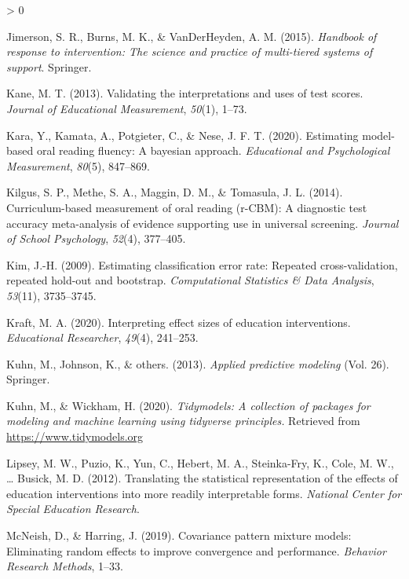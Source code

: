 \documentclass[
  english,
  man, fleqn, noextraspace]{apa6}
\newlength{\cslhangindent}
\newenvironment{CSLReferences}[2] %
 {%
  \setlength{\parindent}{0pt}
  \ifodd #1 \everypar{\setlength{\hangindent}{\cslhangindent}}\ignorespaces\fi
  \ifnum #2 > 0
  \setlength{\parskip}{#2\baselineskip}
  \fi
 }%
 {}
\begin{document}
\begin{CSLReferences}{1}{0}
\leavevmode\hypertarget{ref-jimerson2015}{}%
Jimerson, S. R., Burns, M. K., \& VanDerHeyden, A. M. (2015). \emph{Handbook of response to intervention: The science and practice of multi-tiered systems of support}. Springer.

\leavevmode\hypertarget{ref-kane2013}{}%
Kane, M. T. (2013). Validating the interpretations and uses of test scores. \emph{Journal of Educational Measurement}, \emph{50}(1), 1--73.

\leavevmode\hypertarget{ref-kara2020}{}%
Kara, Y., Kamata, A., Potgieter, C., \& Nese, J. F. T. (2020). Estimating model-based oral reading fluency: A bayesian approach. \emph{Educational and Psychological Measurement}, \emph{80}(5), 847--869.

\leavevmode\hypertarget{ref-kilgus2014}{}%
Kilgus, S. P., Methe, S. A., Maggin, D. M., \& Tomasula, J. L. (2014). Curriculum-based measurement of oral reading (r-CBM): A diagnostic test accuracy meta-analysis of evidence supporting use in universal screening. \emph{Journal of School Psychology}, \emph{52}(4), 377--405.

\leavevmode\hypertarget{ref-kim2009}{}%
Kim, J.-H. (2009). Estimating classification error rate: Repeated cross-validation, repeated hold-out and bootstrap. \emph{Computational Statistics \& Data Analysis}, \emph{53}(11), 3735--3745.

\leavevmode\hypertarget{ref-kraft2020}{}%
Kraft, M. A. (2020). Interpreting effect sizes of education interventions. \emph{Educational Researcher}, \emph{49}(4), 241--253.

\leavevmode\hypertarget{ref-kuhn2013}{}%
Kuhn, M., Johnson, K., \& others. (2013). \emph{Applied predictive modeling} (Vol. 26). Springer.

\leavevmode\hypertarget{ref-R-tidymodels}{}%
Kuhn, M., \& Wickham, H. (2020). \emph{Tidymodels: A collection of packages for modeling and machine learning using tidyverse principles.} Retrieved from \url{https://www.tidymodels.org}

\leavevmode\hypertarget{ref-lipsey2012}{}%
Lipsey, M. W., Puzio, K., Yun, C., Hebert, M. A., Steinka-Fry, K., Cole, M. W., \ldots{} Busick, M. D. (2012). Translating the statistical representation of the effects of education interventions into more readily interpretable forms. \emph{National Center for Special Education Research}.

\leavevmode\hypertarget{ref-mcneish2019}{}%
McNeish, D., \& Harring, J. (2019). Covariance pattern mixture models: Eliminating random effects to improve convergence and performance. \emph{Behavior Research Methods}, 1--33.


\end{CSLReferences}
\end{document}
